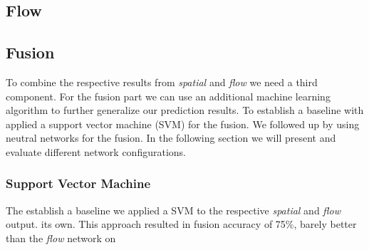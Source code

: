 \subsection{Flow}
\label{subsec:flow}



\subsection{Fusion}
\label{subsec:fusion}

To combine the respective results from \emph{spatial} and \emph{flow} we need a third component.
For the fusion part we can use an additional machine learning algorithm to further generalize our prediction results. To establish a baseline with applied a support vector machine (SVM) for the fusion. We followed up by using neutral networks for the fusion. In the following section we will present and evaluate different network configurations.

\subsubsection{Support Vector Machine}
The establish a baseline we applied a SVM to the respective \emph{spatial} and \emph{flow} output. 
its own.
This approach resulted in fusion accuracy of 75\%, barely better than the \emph{flow} network on 

